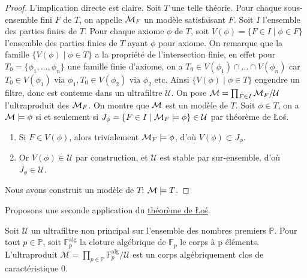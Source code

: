 \begin{proof}
L'implication directe est claire. Soit $T$ une telle théorie. Pour chaque sous-ensemble fini $F$ de $T$, on appelle $\mathcal{M}_F$ un modèle satisfaisant $F$.
Soit $I$ l'ensemble des parties finies de $T$. Pour chaque axiome $\phi$ de $T$, soit $V(\phi) = \{F \in I \mid \phi \in F \}$
l'ensemble des parties finies de $T$ ayant $\phi$ pour axiome. On remarque que la famille $\{V(\phi) \mid \phi \in T\}$ a la propriété 
de l'intersection finie, en effet pour $T_0 = \{\phi_1,\dots,\phi_n\}$ une famille finie d'axiome, on a $T_0 \in V(\phi_1) \cap \dots \cap V(\phi_n)$ 
car $T_0 \in V(\phi_1) \text{ via } \phi_1, T_0 \in V(\phi_2) \text{ via } \phi_2$ etc. Ainsi $\{V(\phi) \mid \phi \in T\}$ engendre un filtre,
donc est contenue dans un ultrafiltre $\mathcal{U}$. On pose $\mathcal{M} = \prod_{F \in I} \mathcal{M}_F / \mathcal{U}$ l'ultraproduit des $\mathcal{M}_F$. On montre que $\mathcal{M}$ est un modèle de $T$.
Soit $\phi \in T$, on a $\mathcal{M} \models \phi$ si et seulement si $J_{\phi} = \{ F \in I \mid \mathcal{M}_F \models \phi \} \in \mathcal{U}$ par théorème de \L{}oś.
\begin{enumerate}
\item Si $F \in V(\phi)$, alors trivialement $\mathcal{M}_F \models \phi$, d'où $V(\phi) \subset J_{\phi}$.
\item Or $V(\phi) \in \mathcal{U}$ par construction, et $\mathcal{U}$ est stable par sur-ensemble, d'où $J_\phi \in \mathcal{U}$.
\end{enumerate}
Nous avons construit un modèle de $T$: $\mathcal{M} \models T$.
\end{proof}

\noindent Proposons une seconde application du \hyperref[Los]{théorème de \L{}oś}.

\begin{prop}
Soit $\mathcal{U}$ un ultrafiltre non principal sur l'ensemble des nombres premiers $\mathbb{P}$.
Pour tout $p \in \mathbb{P}$, soit $\mathbb{F}^{\text{alg}}_p$ la cloture algébrique de $\mathbb{F}_p$ le corps à p éléments. 
L'ultraproduit $\mathcal{M} = \prod_{p \in \mathbb{P}} \mathbb{F}^{\text{alg}}_p / \mathcal{U}$ est un corps algébriquement clos
de caractéristique $0$.
\end{prop}

